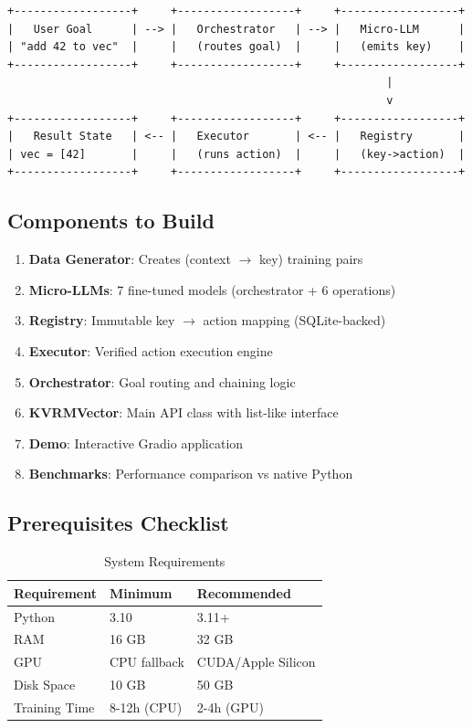 \documentclass[11pt,a4paper]{article}
\begin{document}
\begin{verbatim}
+------------------+     +------------------+     +------------------+
|   User Goal      | --> |   Orchestrator   | --> |   Micro-LLM      |
| "add 42 to vec"  |     |   (routes goal)  |     |   (emits key)    |
+------------------+     +------------------+     +------------------+
                                                          |
                                                          v
+------------------+     +------------------+     +------------------+
|   Result State   | <-- |   Executor       | <-- |   Registry       |
| vec = [42]       |     |   (runs action)  |     |   (key->action)  |
+------------------+     +------------------+     +------------------+
\end{verbatim}

\subsection{Components to Build}

\begin{enumerate}
    \item \textbf{Data Generator}: Creates (context $\to$ key) training pairs
    \item \textbf{Micro-LLMs}: 7 fine-tuned models (orchestrator + 6 operations)
    \item \textbf{Registry}: Immutable key $\to$ action mapping (SQLite-backed)
    \item \textbf{Executor}: Verified action execution engine
    \item \textbf{Orchestrator}: Goal routing and chaining logic
    \item \textbf{KVRMVector}: Main API class with list-like interface
    \item \textbf{Demo}: Interactive Gradio application
    \item \textbf{Benchmarks}: Performance comparison vs native Python
\end{enumerate}

\subsection{Prerequisites Checklist}

\begin{table}[h]
\centering
\begin{tabular}{lll}
\toprule
\textbf{Requirement} & \textbf{Minimum} & \textbf{Recommended} \\
\midrule
Python & 3.10 & 3.11+ \\
RAM & 16 GB & 32 GB \\
GPU & CPU fallback & CUDA/Apple Silicon \\
Disk Space & 10 GB & 50 GB \\
Training Time & 8-12h (CPU) & 2-4h (GPU) \\
\bottomrule
\end{tabular}
\caption{System Requirements}
\end{table}
\end{document}
